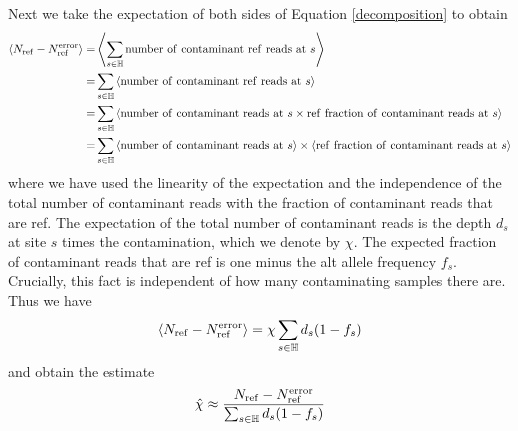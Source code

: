 \documentclass[nofootinbib,amssymb,amsmath]{revtex4}
\newcommand{\ave}[1]{\left\langle #1 \right\rangle}
\begin{document}
Next we take the expectation of both sides of Equation \ref{decomposition} to obtain
\begin{align}
\ave{N_{\rm ref} - N_{\rm ref}^{\rm error}} =& \ave{\sum_{s \in \mathbb{H}} {\rm number~of~contaminant~ref~reads~at~}s} \\
=& \sum_{s \in \mathbb{H}} \ave{{\rm number~of~contaminant~ref~reads~at~}s} \\
=& \sum_{s \in \mathbb{H}} \ave{{\rm number~of~contaminant~reads~at~}s \times {\rm ref~fraction~of~contaminant~reads~at~}s} \\
=& \sum_{s \in \mathbb{H}} \ave{{\rm number~of~contaminant~reads~at~}s} \times \ave{{\rm ref~fraction~of~contaminant~reads~at~}s}
\end{align}
where we have used the linearity of the expectation and the independence of the total number of contaminant reads with the fraction of contaminant reads that are ref.  The expectation of the total number of contaminant reads is the depth $d_s$ at site $s$ times the contamination, which we denote by $\chi$.  The expected fraction of contaminant reads that are ref is one minus the alt allele frequency $f_s$.  Crucially, this fact is independent of how many contaminating samples there are.  Thus we have
\begin{align}
\ave{N_{\rm ref} - N_{\rm ref}^{\rm error}} = \chi \sum_{s \in \mathbb{H}} d_s (1 - f_s)
\end{align}
and obtain the estimate
\begin{align}
\hat{\chi} \approx \frac{N_{\rm ref} - N_{\rm ref}^{\rm error}}{\sum_{s \in \mathbb{H}} d_s (1 - f_s)} \label{contamination_estimate}
\end{align}
\end{document}
